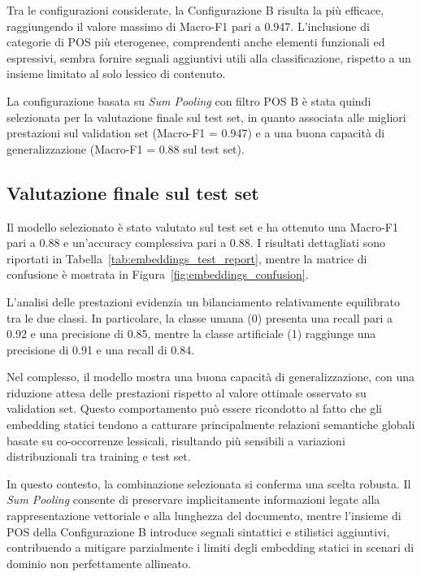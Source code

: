 \documentclass{article}
\begin{document}
Tra le configurazioni considerate, la Configurazione B risulta la più efficace, raggiungendo il valore massimo di Macro-F1 pari a 0.947. L’inclusione di categorie di POS più eterogenee, comprendenti anche elementi funzionali ed espressivi, sembra fornire segnali aggiuntivi utili alla classificazione, rispetto a un insieme limitato al solo lessico di contenuto.

La configurazione basata su \textit{Sum Pooling} con filtro POS B è stata quindi selezionata per la valutazione finale sul test set, in quanto associata alle migliori prestazioni sul validation set (Macro-F1 = 0.947) e a una buona capacità di generalizzazione (Macro-F1 = 0.88 sul test set).

\subsection{Valutazione finale sul test set}

Il modello selezionato è stato valutato sul test set e ha ottenuto una Macro-F1 pari a 0.88 e un’accuracy complessiva pari a 0.88. I risultati dettagliati sono riportati in Tabella~\ref{tab:embeddings_test_report}, mentre la matrice di confusione è mostrata in Figura~\ref{fig:embeddings_confusion}.

L’analisi delle prestazioni evidenzia un bilanciamento relativamente equilibrato tra le due classi. In particolare, la classe umana (0) presenta una recall pari a 0.92 e una precisione di 0.85, mentre la classe artificiale (1) raggiunge una precisione di 0.91 e una recall di 0.84.

Nel complesso, il modello mostra una buona capacità di generalizzazione, con una riduzione attesa delle prestazioni rispetto al valore ottimale osservato su validation set. Questo comportamento può essere ricondotto al fatto che gli embedding statici tendono a catturare principalmente relazioni semantiche globali basate su co-occorrenze lessicali, risultando più sensibili a variazioni distribuzionali tra training e test set.

In questo contesto, la combinazione selezionata si conferma una scelta robusta. Il \textit{Sum Pooling} consente di preservare implicitamente informazioni legate alla rappresentazione vettoriale e alla lunghezza del documento, mentre l'insieme di POS della Configurazione B introduce segnali sintattici e stilistici aggiuntivi, contribuendo a mitigare parzialmente i limiti degli embedding statici in scenari di dominio non perfettamente allineato.
\end{document}
